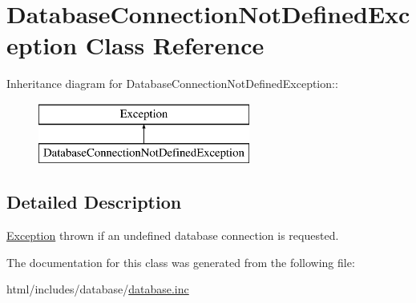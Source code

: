 \hypertarget{classDatabaseConnectionNotDefinedException}{
\section{DatabaseConnectionNotDefinedException Class Reference}
\label{classDatabaseConnectionNotDefinedException}
}
Inheritance diagram for DatabaseConnectionNotDefinedException::\begin{figure}[H]
\begin{center}
\leavevmode
\includegraphics[height=2cm]{classDatabaseConnectionNotDefinedException}
\end{center}
\end{figure}


\subsection{Detailed Description}
\hyperlink{classException}{Exception} thrown if an undefined database connection is requested. 

The documentation for this class was generated from the following file:\begin{DoxyCompactItemize}
\item 
html/includes/database/\hyperlink{database_8inc}{database.inc}\end{DoxyCompactItemize}
